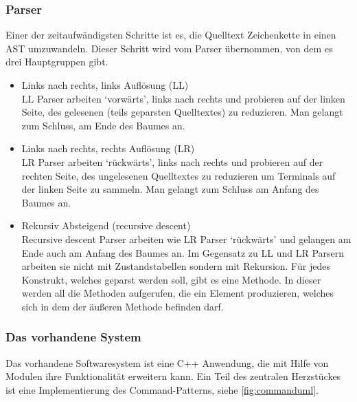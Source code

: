    \subsubsection{Parser}
    \label{sssec:Parser}
      Einer der zeitaufwändigsten Schritte ist es, die Quelltext Zeichenkette in einen AST umzuwandeln. Dieser Schritt wird vom Parser übernommen, von dem es drei Hauptgruppen gibt.
      \begin{itemize}
        \item Links nach rechts, links Auflösung (LL) \autocite[S.77\,f.]{eirund2013formale}\\
          LL Parser arbeiten `vorwärts', links nach rechts und probieren auf der linken Seite, des gelesenen (teils geparsten Quelltextes) zu reduzieren. Man gelangt zum Schluss, am Ende des Baumes an.
        \item Links nach rechts, rechts Auflösung (LR) \autocite[S.77\,f.]{eirund2013formale}\\
          LR Parser arbeiten `rückwärts', links nach rechts und probieren auf der rechten Seite, des ungelesenen Quelltextes zu reduzieren um Terminals auf der linken Seite zu sammeln. Man gelangt zum Schluss am Anfang des Baumes an. \autocite{cs143-stanford}
        \item Rekursiv Absteigend (recursive descent)\\
          Recursive descent Parser arbeiten wie LR Parser `rückwärts' und gelangen am Ende auch am Anfang des Baumes an. Im Gegensatz zu LL und LR Parsern arbeiten sie nicht mit Zustandstabellen sondern mit Rekursion. Für jedes Konstrukt, welches geparst werden soll, gibt es eine Methode. In dieser werden all die Methoden aufgerufen, die ein Element produzieren, welches sich in dem der äußeren Methode befinden darf.
      \end{itemize}

    \subsubsection{Das vorhandene System}
    \label{sssec:Das vorhandene System}
      Das vorhandene Softwaresystem ist eine C++ Anwendung, die mit Hilfe von Modulen ihre Funktionalität erweitern kann. Ein Teil des zentralen Herzstückes ist eine Implementierung des Command-Patterns, siehe \autoref{fig:commanduml}.

